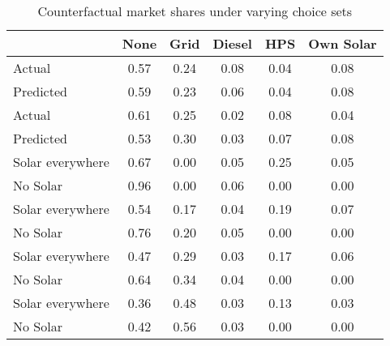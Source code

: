 \begin{table}[htbp]\centering
\caption{Counterfactual market shares under varying choice sets}
\begin{tabular}{l*{5}{c}}
\toprule
            &        None&        Grid&      Diesel&         HPS&   Own Solar\\
\midrule
Actual      &        0.57&        0.24&        0.08&        0.04&        0.08\\
Predicted   &        0.59&        0.23&        0.06&        0.04&        0.08\\
Actual      &        0.61&        0.25&        0.02&        0.08&        0.04\\
Predicted   &        0.53&        0.30&        0.03&        0.07&        0.08\\
Solar everywhere&        0.67&        0.00&        0.05&        0.25&        0.05\\
No Solar    &        0.96&        0.00&        0.06&        0.00&        0.00\\
Solar everywhere&        0.54&        0.17&        0.04&        0.19&        0.07\\
No Solar    &        0.76&        0.20&        0.05&        0.00&        0.00\\
Solar everywhere&        0.47&        0.29&        0.03&        0.17&        0.06\\
No Solar    &        0.64&        0.34&        0.04&        0.00&        0.00\\
Solar everywhere&        0.36&        0.48&        0.03&        0.13&        0.03\\
No Solar    &        0.42&        0.56&        0.03&        0.00&        0.00\\
\bottomrule
\end{tabular}
\end{table}
